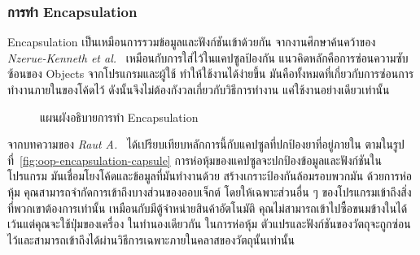 \documentclass[12pt,one side,openright,a4paper]{cpe-thesis-th}
\newcommand{\thaijustify}[1]{%
  \par\hspace{30pt}\justifying
  #1
}
\begin{document}
\subsubsection{การทำ Encapsulation}
\thaijustify{
  Encapsulation เป็นเหมือนการรวมข้อมูลและฟังก์ชันเข้าด้วยกัน จากงานศึกษาค้นคว้าของ \textit{Nzerue-Kenneth et al.}~\cite{nzeruekenneth23polymorph} เหมือนกับการใส่ไว้ในแคปซูลป้องกัน แนวคิดหลักคือการซ่อนความซับซ้อนของ Objects จากโปรแกรมและผู้ใช้ ทำให้ใช้งานได้ง่ายขึ้น มันคือทั้งหมดที่เกี่ยวกับการซ่อนการทำงานภายในของโค้ดไว้ ดังนั้นจึงไม่ต้องกังวลเกี่ยวกับวิธีการทำงาน แค่ใช้งานอย่างเดียวเท่านั้น
}
\begin{figure}[H]
  \centering
  \caption[แผนผังอธิบายการทำ Encapsulation]{แผนผังอธิบายการทำ Encapsulation}
  \label{fig:oop-encapsulation}
\end{figure}
\thaijustify{
  จากบทความของ \textit{Raut A.}~\cite{raut22encapsule} ได้เปรียบเทียบหลักการนี้กับแคปซูลที่ปกป้องยาที่อยู่ภายใน ตามในรูปที่~\ref{fig:oop-encapsulation-capsule} การห่อหุ้มของแคปซูลจะปกป้องข้อมูลและฟังก์ชันในโปรแกรม มันเชื่อมโยงโค้ดและข้อมูลที่มันทำงานด้วย สร้างเกราะป้องกันล้อมรอบพวกมัน ด้วยการห่อหุ้ม คุณสามารถจำกัดการเข้าถึงบางส่วนของออบเจ็กต์ โดยให้เฉพาะส่วนอื่น ๆ ของโปรแกรมเข้าถึงสิ่งที่พวกเขาต้องการเท่านั้น เหมือนกับมีตู้จำหน่ายสินค้าอัตโนมัติ คุณไม่สามารถเข้าไปซื้อขนมข้างในได้เว้นแต่คุณจะใช้ปุ่มของเครื่อง ในทำนองเดียวกัน ในการห่อหุ้ม ตัวแปรและฟังก์ชันของวัตถุจะถูกซ่อนไว้และสามารถเข้าถึงได้ผ่านวิธีการเฉพาะภายในคลาสของวัตถุนั้นเท่านั้น
}
\end{document}
